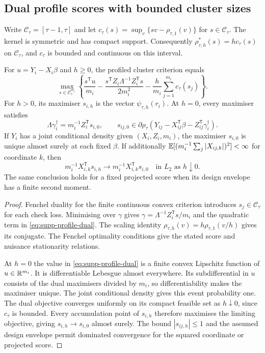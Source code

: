 \subsection{Dual profile scores with bounded cluster sizes}

Write $\mathcal C_\tau=[\tau-1,\tau]$ and let
$c_\tau(s)=\sup_v\{sv-\rho_{\tau,1}(v)\}$ for $s\in\mathcal C_\tau$.
The kernel is symmetric and has compact support. Consequently
$\rho_{\tau,h}^*(s)=h c_\tau(s)$ on $\mathcal C_\tau$, and
$c_\tau$ is bounded and continuous on this interval.

\begin{proposition}\label{prop:supp-dual-profile}
For $u=Y_i-X_i\beta$ and $h\geq0$, the profiled cluster criterion equals
\begin{equation}\label{eq:supp-profile-dual}
 \max_{s\in\mathcal C_\tau^{m_i}}
 \left\{
 \frac{s^{\mathsf T}u}{m_i}
 -\frac{s^{\mathsf T}Z_i\Lambda^{-1}Z_i^{\mathsf T}s}{2m_i^2}
 -\frac{h}{m_i}\sum_{j=1}^{m_i}c_\tau(s_j)
 \right\}.
\end{equation}
For $h>0$, its maximiser $s_{i,h}$ is the vector
$\psi_{\tau,h}(r_i)$. At $h=0$, every maximiser satisfies
\[
 \Lambda\gamma_i^\dagger=m_i^{-1}Z_i^{\mathsf T}s_{i,0},
 \qquad
 s_{ij,0}\in\partial\rho_\tau
 (Y_{ij}-X_{ij}^{\mathsf T}\beta-Z_{ij}^{\mathsf T}\gamma_i^\dagger).
\]
If $Y_i$ has a joint conditional density given $(X_i,Z_i,m_i)$,
the maximiser $s_{i,0}$ is unique almost surely at each fixed $\beta$.
If additionally
$\mathbb{E}[(m_i^{-1}\sum_j|X_{ij,k}|)^2]<\infty$ for coordinate $k$, then
\[
 m_i^{-1}X_{i,k}^{\mathsf T}s_{i,h}
 \longrightarrow m_i^{-1}X_{i,k}^{\mathsf T}s_{i,0}
 \quad\text{in }L_2\text{ as }h\downarrow0.
\]
The same conclusion holds for a fixed projected score when its design
envelope has a finite second moment.
\end{proposition}

\begin{proof}
Fenchel duality for the finite continuous convex criterion introduces
$s_j\in\mathcal C_\tau$ for each check loss. Minimising over $\gamma$
gives $\gamma=\Lambda^{-1}Z_i^{\mathsf T}s/m_i$ and the quadratic term
in \eqref{eq:supp-profile-dual}. The scaling identity
$\rho_{\tau,h}(v)=h\rho_{\tau,1}(v/h)$ gives its conjugate.
The Fenchel optimality conditions give the stated score and nuisance
stationarity relations.

At $h=0$ the value in \eqref{eq:supp-profile-dual} is a finite convex
Lipschitz function of $u\in\mathbb{R}^{m_i}$. It is differentiable Lebesgue
almost everywhere. Its subdifferential in $u$ consists of the dual
maximisers divided by $m_i$, so differentiability makes the maximiser
unique. The joint conditional density gives this event probability one.
The dual objective converges uniformly on its compact feasible set as
$h\downarrow0$, since $c_\tau$ is bounded. Every accumulation point of
$s_{i,h}$ therefore maximises the limiting objective, giving
$s_{i,h}\to s_{i,0}$ almost surely. The bound
$|s_{ij,h}|\leq1$ and the assumed design envelope permit dominated
convergence for the squared coordinate or projected score.
\end{proof}

